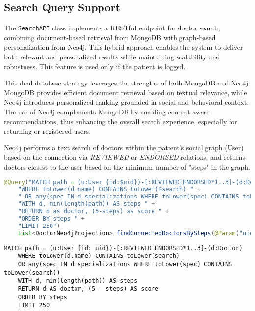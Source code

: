 \subsection{Search Query Support}
The \texttt{SearchAPI} class implements a RESTful endpoint for doctor search, combining document-based retrieval from MongoDB with graph-based personalization from Neo4j. This hybrid approach enables the system to deliver both relevant and personalized results while maintaining scalability and robustness. This feature is used only if the patient is logged. 

This dual-database strategy leverages the strengths of both MongoDB and Neo4j: MongoDB provides efficient document retrieval based on textual relevance, while Neo4j introduces personalized ranking grounded in social and behavioral context. The use of Neo4j complements MongoDB by enabling context-aware recommendations, thus enhancing the overall search experience, especially for returning or registered users. 

Neo4j performs a text search of doctors within the patient's social graph (User) based on the connection via \textit{REVIEWED} or \textit{ENDORSED} relations, and returns doctors closest to the user based on the minimum number of "steps" in the graph.

\begin{lstlisting}[language=java, caption={Java code for the Neo4j Search Query}
	]
	@Query("MATCH path = (u:User {id:$uid})-[:REVIEWED|ENDORSED*1..3]-(d:Doctor) " +
	"WHERE toLower(d.name) CONTAINS toLower($search) " +
	" OR any(spec IN d.specializations WHERE toLower(spec) CONTAINS toLower($search)) " +
	"WITH d, min(length(path)) AS steps " +
	"RETURN d as doctor, (5-steps) as score " +
	"ORDER BY steps " +
	"LIMIT 250")
	List<DoctorNeo4jProjection> findConnectedDoctorsBySteps(@Param("uid") String patientId, @Param("search") String search);
\end{lstlisting}


\begin{lstlisting}[language=cypher, caption={Equivalent Cypher query for Neo4j Search Query}]
	MATCH path = (u:User {id: uid})-[:REVIEWED|ENDORSED*1..3]-(d:Doctor)
	WHERE toLower(d.name) CONTAINS toLower(search)
	OR any(spec IN d.specializations WHERE toLower(spec) CONTAINS toLower(search))
	WITH d, min(length(path)) AS steps
	RETURN d AS doctor, (5 - steps) AS score
	ORDER BY steps
	LIMIT 250
\end{lstlisting}

